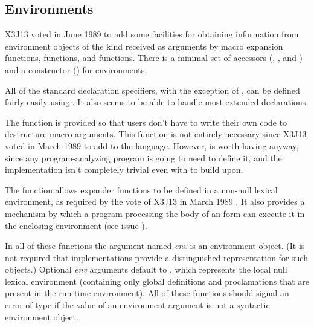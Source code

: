 \begin{newer}
\section{Environments}

X3J13 voted in June 1989  to add some facilities for obtaining information
from environment objects of the kind received as arguments
by macro expansion functions,  functions,
and  functions.
There is a minimal set of accessors (,
, and ) and a constructor
() for environments.

All of the standard declaration specifiers, with the exception of ,
can be defined fairly easily using .  It also
seems to be able to handle most extended declarations.

The function  is provided so that
users don't have to write their
  own code to destructure macro arguments.
This function is not entirely necessary since X3J13 voted
in March 1989 
to add  to the language.
  However,  is worth having anyway, since any program-analyzing
  program is going to need to define it, and the implementation isn't completely
  trivial even with  to build upon.

  The function  allows expander functions to be defined in a non-null
  lexical environment, as required by the vote of X3J13 in
  March 1989 .  It
  also provides a mechanism by which a program processing
  the body of an  form
  can execute it in the enclosing environment (see issue
  ).

In all of these functions the argument named \emph{env} is an environment
object.  (It is not required that implementations
 provide a distinguished representation for such objects.)  Optional \emph{env}
 arguments default to , which represents the local null lexical environment
 (containing only global definitions and proclamations that are present in the
 run-time environment).  All of these functions should signal an error of type
  if the value of an environment argument is not a syntactic
 environment object.


\end{newer}
